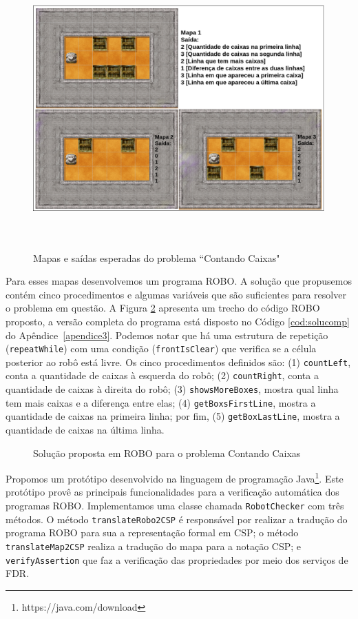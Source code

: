 \begin{figure}[h]
\centering
\caption{Mapas e saídas esperadas do problema ``Contando Caixas"}
\includegraphics[height=10cm]{figuras/problema.png}
\label{fig:problem}
\end{figure}

Para esses mapas desenvolvemos um programa ROBO. A solução que propusemos contém cinco procedimentos e algumas variáveis que são suficientes para resolver o problema em questão. A Figura \ref{fig:solution} apresenta um trecho do código ROBO proposto, a versão completa do programa está disposto no Código \ref{cod:solucomp} do Apêndice~\ref{apendice3}. Podemos notar que há uma estrutura de repetição (\texttt{repeatWhile}) com uma condição (\texttt{frontIsClear}) que verifica se a célula posterior ao robô está livre. Os cinco procedimentos definidos são: (1) \texttt{countLeft}, conta a quantidade de caixas à esquerda do robô; (2) \texttt{countRight}, conta a quantidade de caixas à direita do robô; (3) \texttt{showsMoreBoxes}, mostra qual linha tem mais caixas e a diferença entre elas; (4) \texttt{getBoxsFirstLine}, mostra a quantidade de caixas na primeira linha; por fim, (5) \texttt{getBoxLastLine}, mostra a quantidade de caixas na última linha.

\begin{figure}[!h]
\centering
\caption{Solução proposta em ROBO para o problema Contando Caixas}

\label{fig:solution}
\end{figure}

Propomos um protótipo desenvolvido na linguagem de programação Java\footnote[7]{https://java.com/download}. Este protótipo provê as principais funcionalidades para a verificação automática dos programas ROBO. Implementamos uma classe chamada \texttt{RobotChecker} com três métodos. O método \texttt{translateRobo2CSP} é responsável por realizar a tradução do programa ROBO para sua a representação formal em CSP; o método \texttt{translateMap2CSP} realiza a tradução do mapa para a notação CSP; e \texttt{verifyAssertion} que faz a verificação das propriedades por meio dos serviços de FDR.

